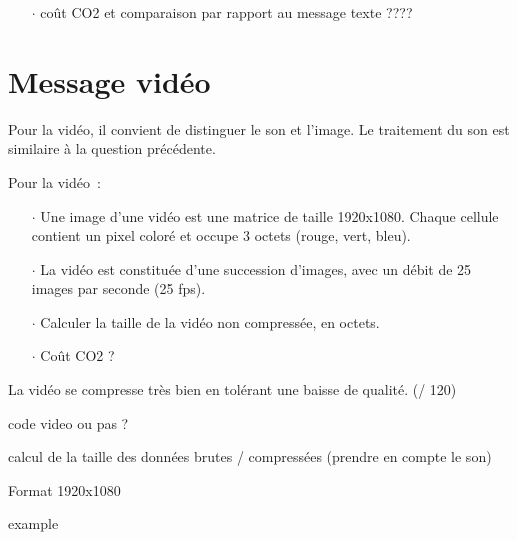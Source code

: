 \documentclass[a4paper]{article}
\begin{document}
\begin{itemize}
\item[$\cdot$] coût CO2 et comparaison par rapport au message texte ????
\end{itemize}






\section{Message vidéo}

Pour la vidéo, il convient de distinguer le son et l'image. Le traitement du son est similaire à la question précédente.

Pour la vidéo~:

\begin{itemize}
\item[$\cdot$] Une image d'une vidéo est une matrice de taille 1920x1080. Chaque cellule contient un pixel coloré et occupe 3 octets (rouge, vert, bleu).
\item[$\cdot$] La vidéo est constituée d'une succession d'images, avec un débit de 25 images par seconde (25 fps).
\item[$\cdot$] Calculer la taille de la vidéo non compressée, en octets.
\item[$\cdot$] Coût CO2 ?
\end{itemize}

La vidéo se compresse très bien en tolérant une baisse de qualité.  (/ 120)



code video ou pas ?

calcul de la taille des données brutes / compressées (prendre en compte le son)

Format 1920x1080


 example
\end{document}
